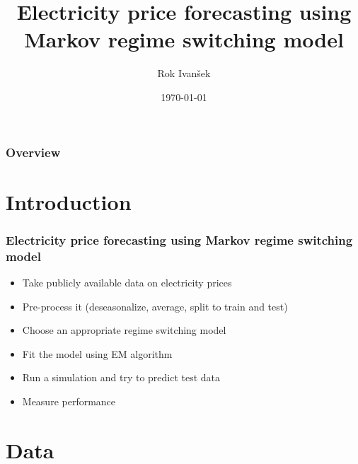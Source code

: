 \documentclass{beamer}
\title[Markov switching]{Electricity price forecasting using Markov regime switching model} %
\author{Rok Ivanšek} %
\institute[University of Ljubljana] %
{
Faculty of Mathematics and Physics \\ %
\medskip
}
\date{\today} %
\begin{document}
\begin{frame}
\titlepage %
\end{frame}

\begin{frame}
\frametitle{Overview} %
\tableofcontents %
\end{frame}


\section{Introduction}

\begin{frame}
\frametitle{Electricity price forecasting using Markov regime switching model}

\begin{itemize}
\item Take publicly available data on electricity prices
\item Pre-process it (deseasonalize, average, split to train and test)
\item Choose an appropriate regime switching model
\item Fit the model using EM algorithm
\item Run a simulation and try to predict test data
\item Measure performance
\end{itemize}

\end{frame}

\section{Data} %
\end{document}
